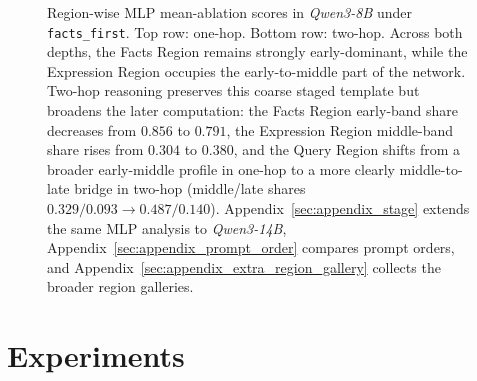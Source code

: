 \documentclass[11pt]{article}
\begin{document}
\begin{figure}[t]
    \caption{Region-wise MLP mean-ablation scores in \textit{Qwen3-8B} under \texttt{facts\_first}. Top row: one-hop. Bottom row: two-hop. Across both depths, the Facts Region remains strongly early-dominant, while the
  Expression Region occupies the early-to-middle part of the network. Two-hop reasoning preserves this coarse staged template but broadens the later computation: the Facts Region
  early-band share decreases from $0.856$ to $0.791$, the Expression Region middle-band share rises from $0.304$ to $0.380$, and the Query Region shifts from a broader early-middle
  profile in one-hop to a more clearly middle-to-late bridge in two-hop (middle/late shares $0.329/0.093 \rightarrow 0.487/0.140$). Appendix~\ref{sec:appendix_stage} extends the same
  MLP analysis to \textit{Qwen3-14B}, Appendix~\ref{sec:appendix_prompt_order} compares prompt orders, and Appendix~\ref{sec:appendix_extra_region_gallery} collects the broader
  region galleries.}
    \label{fig:stage}
    \vspace{-0.5em}
  \end{figure}

\section{Experiments}
\label{sec:results}

\end{document}
